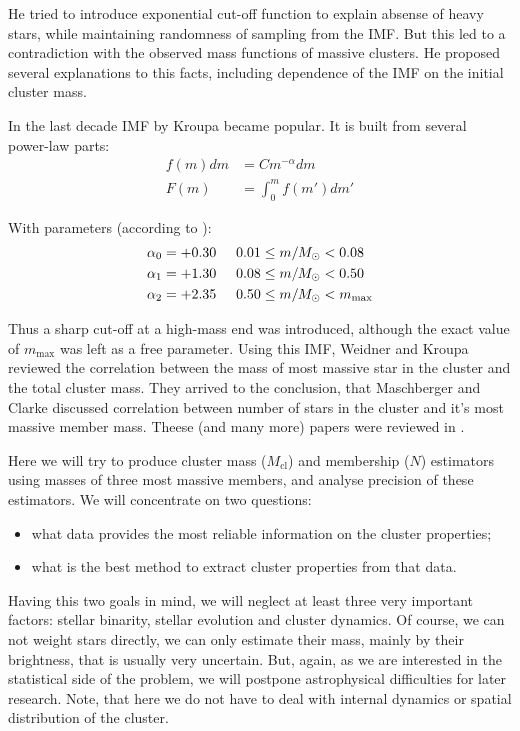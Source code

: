 \documentclass{aastex}
\newcommand{\MSun}{M_\odot}
\newcommand{\Mmax}{m_{\mathrm{max}}}
\newcommand{\Mcl}{M_{\mathrm{cl}}}
\begin{document}
He tried to introduce exponential cut-off function to explain absense of heavy stars, while maintaining randomness of sampling from the IMF. But this led to a contradiction with the observed mass functions of massive clusters. He proposed several explanations to 
this facts, including dependence of the IMF on the initial cluster mass.

In the last decade IMF by Kroupa \citet{Kroupa2001} became popular.  
It is built from several power-law parts:
\begin{align} \label{eq:spectrum}
 f(m)dm &= C m^{-\alpha} dm  \nonumber \\
 F(m) &= \int_0^{m} f(m')dm'
\end{align} 

With parameters (according to \citet{Kroupa2001}):
\begin{align} %
  \alpha_0 = +0.30 &\hspace{0.5cm} 0.01 \leq m/\MSun < 0.08 \nonumber \\
  \alpha_1 = +1.30 &\hspace{0.5cm}  0.08 \leq m/\MSun < 0.50 \\
  \alpha_2 = +2.35 &\hspace{0.5cm}  0.50 \leq m/\MSun < \Mmax \nonumber 
\end{align} 

Thus a sharp cut-off at a high-mass end was introduced, although the exact value of $\Mmax$ was left as a free parameter.
Using this IMF, Weidner and Kroupa \citet{Origin} reviewed the correlation between the mass of most massive star in the cluster and the total cluster mass. They arrived to the conclusion, that 
Maschberger and Clarke \citet{MassFromN} discussed correlation between number of stars in the cluster and it's most massive member mass. Theese (and many more) papers were reviewed in \citet{Kroupa2010}. 

Here we will try to produce cluster mass ($\Mcl$) and membership ($N$) estimators using masses of three most massive members,
and analyse precision of these estimators. We will concentrate on two questions: 
\begin{itemize}
 \item what data provides the most reliable information on the cluster properties;
 \item what is the best method to extract cluster properties from that data.
\end{itemize}

Having this two goals in mind, we will neglect at least three very important factors: stellar binarity, stellar evolution and cluster dynamics.
Of course, we can not weight stars directly, we can only estimate their mass, mainly by their brightness, that is usually very uncertain.
But, again, as we are interested in the statistical side of the problem, we will postpone astrophysical
difficulties for later research. 
Note, that here we do not have to deal with internal dynamics or spatial distribution of the cluster.
\end{document}
